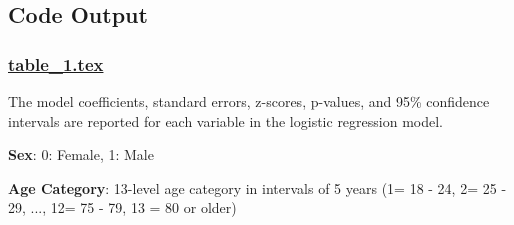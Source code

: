 \documentclass[11pt]{article}
\begin{document}
\subsection{Code Output}

\subsubsection*{\hyperlink{code-LaTeX Table Design-table-1-tex}{table\_1.tex}}

\begin{codeoutput}
\begin{table}[h]
\caption{Associations between physical activity, fruit and vegetable consumption, BMI, age, sex and education level with diabetes}
\label{table:associations_physical_activity_BMI_diabetes}
\begin{threeparttable}
\renewcommand{\TPTminimum}{\linewidth}
\begin{tablenotes}
\footnotesize
\item The model coefficients, standard errors, z-scores, p-values, and 95\% confidence intervals are reported for each variable in the logistic regression model.
\item \textbf{Sex}: 0: Female, 1: Male
\item \textbf{Age Category}: 13-level age category in intervals of 5 years (1= 18 - 24, 2= 25 - 29, ..., 12= 75 - 79, 13 = 80 or older)

\end{tablenotes}
\end{threeparttable}
\end{table}
\end{codeoutput}
\end{document}
